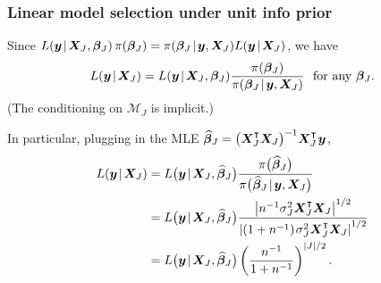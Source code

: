 \documentclass[18pt]{beamer}
\newcommand{\defineTightSpacing}{%
	\setlength{\abovedisplayskip}{.25\baselineskip}%
	\setlength{\belowdisplayskip}{.25\baselineskip}%
}
\renewcommand{\textsc}[1]{{\small \MakeUppercase{#1}}}
\newcommand{\given}{\mskip.7\thinmuskip | \mskip.7\thinmuskip}
\newcommand{\transpose}{\text{\raisebox{.5ex}{$\intercal$}}}
\newcommand{\thinnerspace}{\mskip.5\thinmuskip}
\newcommand{\density}{\operatorname{\pi}}
\newcommand{\likelihood}{L}
\newcommand{\by}{\bm{y}}
\newcommand{\bX}{\bm{X}}
\newcommand{\bbeta}{\bm{\beta}}
\newcommand{\model}{\mathcal{M}}
\newcommand{\nonzeroCoefSet}{J}
\begin{document}
\begin{frame}
\frametitle{Linear model selection under unit info prior}
Since $\likelihood(\by \given \bX_\nonzeroCoefSet, \bbeta_\nonzeroCoefSet) \density(\bbeta_\nonzeroCoefSet) = \density(\bbeta_\nonzeroCoefSet \given \by, \bX_\nonzeroCoefSet) \likelihood(\by \given \bX_\nonzeroCoefSet)$, we have
\begin{equation*} \defineTightSpacing%
\likelihood(\by \given \bX_\nonzeroCoefSet)
	= \likelihood(\by \given \bX_\nonzeroCoefSet, \bbeta_\nonzeroCoefSet) \frac{\density(\bbeta_\nonzeroCoefSet)}{\density(\bbeta_\nonzeroCoefSet \given \by, \bX_\nonzeroCoefSet)}
	\ \text{ for any } \bbeta_\nonzeroCoefSet.
\end{equation*}
(The conditioning on $\model_\nonzeroCoefSet$ is implicit.)


In particular, plugging in the \textsc{mle} $\widehat{\bbeta}_\nonzeroCoefSet = \left( \bX_\nonzeroCoefSet^\transpose \bX_\nonzeroCoefSet \right)^{-1} \! \bX_\nonzeroCoefSet^\transpose \thinnerspace \by$, 
\begin{equation*} \defineTightSpacing%
\begin{aligned}
\likelihood(\by \given \bX_\nonzeroCoefSet)
	&= \likelihood\big( \by \given \bX_\nonzeroCoefSet, \widehat{\bbeta}_\nonzeroCoefSet \big) \frac{\density\!\big( \widehat{\bbeta}_\nonzeroCoefSet  \big)}{\density\!\big(\widehat{\bbeta}_\nonzeroCoefSet \given \by, \bX_\nonzeroCoefSet \big)} \\
	&= \likelihood\big( \by \given \bX_\nonzeroCoefSet, \widehat{\bbeta}_\nonzeroCoefSet \big)
	\frac{
		\left| n^{-1} \sigma_\nonzeroCoefSet^2 \bX_\nonzeroCoefSet^\transpose \bX_\nonzeroCoefSet \right|^{1/2}
	}{
		\left| (1 + n^{-1}) \thinnerspace \sigma_\nonzeroCoefSet^2 \bX_\nonzeroCoefSet^\transpose \bX_\nonzeroCoefSet \right|^{1/2}
	} \\
	&= \likelihood\big( \by \given \bX_\nonzeroCoefSet, \widehat{\bbeta}_\nonzeroCoefSet \big) 
		\left( \frac{n^{-1}}{1 + n^{-1}} \right)^{| \nonzeroCoefSet | / 2}.
\end{aligned}
\end{equation*}
\end{frame}
\end{document}
